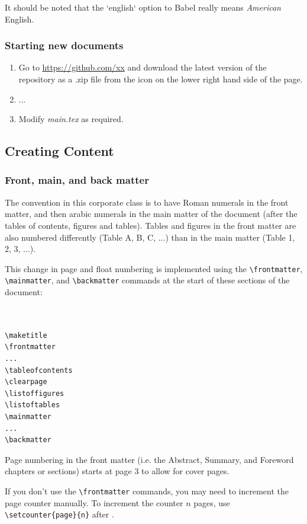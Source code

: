 It should be noted that the `english` option to Babel really means \emph{American} English.

\subsubsection{Starting new documents}
\begin{enumerate}
\item Go to \href{https://github.com/xx}{https://github.com/xx} and download the latest version of the repository as a .zip file from the icon on the lower right hand side of the page.
\item ...
\item Modify \emph{main.tex} as required.
\end{enumerate}


\subsection{Creating Content}
\subsubsection{Front, main, and back matter}
The convention in this corporate class is to have Roman numerals in the front matter, and then arabic numerals in the main matter of the document (after the tables of contents, figures and tables). Tables and figures in the front matter are also numbered differently (Table A, B, C, ...) than in the main matter (Table 1, 2, 3, ...).

This change in page and float numbering is implemented using the \verb+\frontmatter+, \verb+\mainmatter+, and \verb+\backmatter+ commands at the start of these sections of the document:

\begin{lstlisting}


\maketitle
\frontmatter
...
\tableofcontents
\clearpage
\listoffigures
\listoftables
\mainmatter
...
\backmatter

\end{lstlisting}

Page numbering in the front matter (i.e. the Abstract, Summary, and Foreword chapters or sections) starts at page 3 to allow for cover pages.

If you don't use the \verb+\frontmatter+ commands, you may need to increment the page counter manually. To increment the counter $n$ pages, use \verb+\setcounter{page}{n}+ after \verb++.

